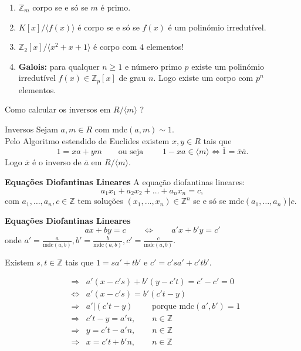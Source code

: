 \documentclass{beamer}
\newcommand{\ZZ}{\mathbb Z}
\newcommand{\mdc}[2]{\mathrm{mdc}({#1}, {#2})}
\begin{document}
\begin{frame}{}
\begin{enumerate}
\item $\ZZ_m$ corpo se e só se $m$ é primo.\pause
\item $K[x]/\langle f(x)\rangle$ é corpo se e só se $f(x)$ é um polinómio irredutível.\pause
\item $\ZZ_2[x]/\langle x^2+x+1\rangle$ é corpo com $4$ elementos!\pause
\item {\bf Galois:} para qualquer $n \geq 1$ e número primo $p$ existe um polinómio irredutível $f(x)\in \ZZ_p[x]$ de grau $n$. Logo existe um corpo com $p^n$ elementos.
\end{enumerate}
\end{frame}


\begin{frame}
Como calcular os inversos em $R/\langle m \rangle$ ?\pause
\begin{block}{Inversos}
Sejam $a,m \in R$ com $\mdc{a}{m} \sim 1$.\\
Pelo Algoritmo estendido de Euclides existem $x,y \in R$ tais que 
$$ 1 = xa + ym \qquad \mbox{ou seja } \qquad 1-xa \in \langle m \rangle \Leftrightarrow \overline{1}=\overline{x}\overline{a}.$$ 
Logo $\overline{x}$ é o inverso de $\overline{a}$ em $R/\langle m \rangle$.
\end{block}
\end{frame}

\begin{frame}{\bf Equações Diofantinas Lineares}
A equação diofantinas lineares:
$$ a_1x_1 + a_2x_2 + \ldots + a_n x_n = c,$$
com $a_1, \ldots, a_n, c \in \ZZ$ tem soluções $(x_1, \ldots, x_n)\in \ZZ^n$ se e só se $\mathrm{mdc}(a_1,\ldots, a_n) | c$.
\end{frame}

\begin{frame}{\bf Equações Diofantinas Lineares}
$$ax+by=c\qquad \Leftrightarrow \qquad a'x+b'y = c'$$
onde $a'=\frac{a}{\mdc{a}{b}}, b'=\frac{b}{\mdc{a}{b}}, c'=\frac{c}{\mdc{a}{b}}$.

Existem $s,t\in \ZZ$ tais que $1=sa'+tb'$ e $c'=c'sa'+c'tb'$.

\begin{eqnarray*}
&\Rightarrow &a'(x-c's)+b'(y-c't) = c'-c'=0\\
&\Leftrightarrow& a'(x-c's)=b'(c't-y) \\
&\Rightarrow& a' | (c't-y) \qquad \mbox{ porque } \mdc{a'}{b'}=1\\
&\Rightarrow& c't-y = a'n, \qquad n\in \ZZ \\
&\Rightarrow& y = c't-a'n, \qquad n\in \ZZ \\
&\Rightarrow& x = c't+b'n, \qquad n\in \ZZ
\end{eqnarray*}
\end{frame}
\end{document}
